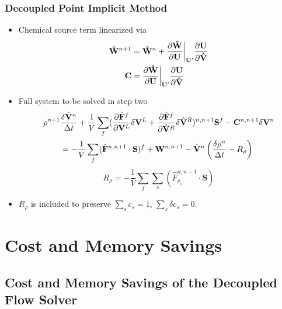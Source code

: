 \documentclass{beamer}
\begin{document}
\begin{frame}
  \frametitle{Decoupled Point Implicit Method}
  \vspace{-0.2cm}
  \begin{itemize}
    \item Chemical source term linearized via
    \vspace{-0.1cm}
    \begin{align*}
      \mathbf{\hat{W}}^{n+1} &= \mathbf{\hat{W}}^n+\frac{\partial
      \mathbf{\hat{W}}}{\partial \mathbf{U}}\bigg|_{\mathbf{U}'} \frac{\partial
      \mathbf{U}}{\partial \mathbf{\hat{V}}} \\
       \mathbf C &= \frac{\partial \mathbf{\hat{W}}}{\partial
       \mathbf{U}}\bigg|_{\mathbf{U}'} \frac{\partial \mathbf{U}}{\partial
       \mathbf{\hat{V}}}
    \end{align*}
    \item Full system to be solved in step two
    \vspace{-0.2cm}
    \begin{gather*}
      \begin{split} \rho^{n+1}&\frac{\delta \hat{\mathbf V}^n}{\Delta t}
        +\frac{1}{V}\sum\limits_{f}(\frac{\partial \hat{\mathbf F}^f}{\partial
        \mathbf V^L}\delta \mathbf V^L +\frac{\partial
        \hat{\mathbf F}^f}{\partial \hat{\mathbf V}^R}\delta
        \hat{\mathbf V}^R)^{n, n+1}\mathbf S^f - \mathbf C^{n, n+1}\delta\mathbf V^n \\ &=
        -\frac{1}{V}\sum\limits_{f}(\hat{\mathbf F}^{n,n+1}\cdot\mathbf S)^f +
        \mathbf W^{n, n+1} -\hat{\mathbf V}^n\left(\frac{\delta \rho^n}{\Delta t} -
        R_\rho\right)
      \end{split} \\ 
    \end{gather*}
    \vspace{-1.4cm}
    \[
      R_\rho = -\frac{1}{V}\sum\limits_{f}{\sum\limits_{s}
      {(\hat{F}_{\rho_s}^{n,n+1}\cdot\mathbf{S})}}
    \]
  \item $R_\rho$ is included to preserve $\sum\limits_{s}{c_s}=1$, $\sum\limits_{s}{\delta c_s}=0$.
  \end{itemize}
\end{frame}

\section{Cost and Memory Savings}
\subsection{Cost and Memory Savings of the Decoupled Flow Solver}
\end{document}
